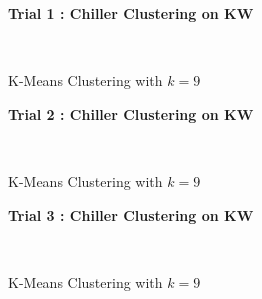 \begin{figure}[!h]
\centerline{\bfseries\Large Trial 1 : Chiller Clustering on KW}\\
\caption{K-Means Clustering with $k=9$}
\end{figure}
\begin{figure}[!h]
\centerline{\bfseries\Large Trial 2 : Chiller Clustering on KW}\\
\caption{K-Means Clustering with $k=9$}
\end{figure}
\begin{figure}[!h]
\centerline{\bfseries\Large Trial 3 : Chiller Clustering on KW}\\
\caption{K-Means Clustering with $k=9$}
\end{figure}
